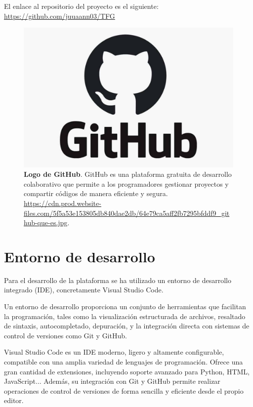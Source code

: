 El enlace al repositorio del proyecto es el siguiente: \url{https://github.com/juuaann03/TFG}


\begin{figure}[H]
     \centering
     \includegraphics[width=1\linewidth]{imagenes/gitHubLogo.jpg}
     \caption[\textbf{Logo de GitHub}.]{\textbf{Logo de GitHub}. GitHub es una plataforma gratuita de desarrollo colaborativo que permite a los programadores gestionar proyectos y compartir códigos de manera eficiente y segura. \href{https://cdn.prod.website-files.com/5f5a53e153805db840dae2db/64e79ca5aff2fb7295bfddf9_github-que-es.jpg}{https://cdn.prod.website-files.com/5f5a53e153805db840dae2db/64e79ca5aff2fb7295bfddf9\_github-que-es.jpg}.}
     \label{logo-github}
 \end{figure}


\newpage


\section{Entorno de desarrollo}

Para el desarrollo de la plataforma se ha utilizado un entorno de desarrollo integrado (IDE), concretamente Visual Studio Code.

Un entorno de desarrollo proporciona un conjunto de herramientas que facilitan la programación, tales como la visualización estructurada de archivos, resaltado de sintaxis, autocompletado, depuración, y la integración directa con sistemas de control de versiones como Git y GitHub.

Visual Studio Code es un IDE moderno, ligero y altamente configurable, compatible con una amplia variedad de lenguajes de programación. Ofrece una gran cantidad de extensiones, incluyendo soporte avanzado para Python, HTML, JavaScript... Además, su integración con Git y GitHub permite realizar operaciones de control de versiones de forma sencilla y eficiente desde el propio editor.

